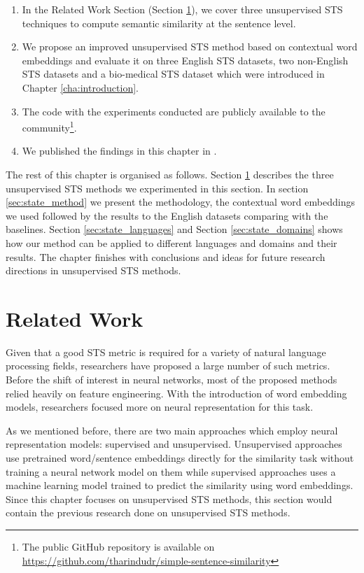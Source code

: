 \begin{enumerate}
	\item In the Related Work Section (Section \ref{sec:state_related}), we cover three unsupervised STS techniques to compute semantic similarity at the sentence level. 
	
	\item We propose an improved unsupervised STS method based on contextual word embeddings and evaluate it on three English STS datasets, two non-English STS datasets and a bio-medical STS dataset which were introduced in Chapter \ref{cha:introduction}.
	
	\item The code with the experiments conducted are publicly available to the community\footnote{The public GitHub repository is available on \url{https://github.com/tharindudr/simple-sentence-similarity}}.
	
	\item We published the findings in this chapter in \citet{ranasinghe-etal-2019-enhancing}.
	
\end{enumerate}

The rest of this chapter is organised as follows. Section \ref{sec:state_related} describes the three unsupervised STS methods we experimented in this section. In section \ref{sec:state_method} we present the methodology, the contextual word embeddings we used followed by the results to the English datasets comparing with the baselines. Section \ref{sec:state_languages} and Section \ref{sec:state_domains} shows how our method can be applied to different languages and domains and their results. The chapter finishes with conclusions and ideas for future research directions in unsupervised STS methods.


\section{Related Work}
\label{sec:state_related}
Given that a good STS metric is required for a variety of natural language processing fields, researchers have proposed a large number of such metrics. Before the shift of interest in neural networks, most of the proposed methods relied heavily on feature engineering. With the introduction of word embedding models, researchers focused more on neural representation for this task. 

As we mentioned before, there are two main approaches which employ neural representation models: supervised and unsupervised. Unsupervised approaches use pretrained word/sentence embeddings directly for the similarity task without training a neural network model on them while supervised approaches uses a machine learning model trained to predict the similarity using word embeddings. Since this chapter focuses on unsupervised STS methods, this section would contain the previous research done on unsupervised STS methods.


